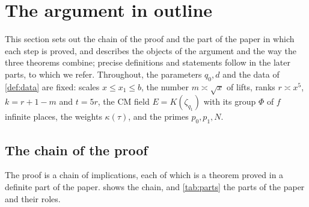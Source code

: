 \section{The argument in outline}\label{sec:overview}

This section sets out the chain of the proof and the part of the paper in which each step is proved, and
describes the objects of the argument and the way the three theorems combine; precise
definitions and statements follow in the later parts, to which we refer. Throughout, the parameters
$q_0,d$ and the data of \cref{def:data} are fixed: scales $x\le x_1\le b$, the number $m\asymp\sqrt x$
of lifts, ranks $r\asymp x^5$, $k=r+1-m$ and $t=5r$, the CM field $E=K(\zeta_{q_1})$ with its group
$\Phi$ of $f$ infinite places, the weights $\kappa(\tau)$, and the primes $p_0,p_1,N$.

\subsection{The chain of the proof}\label{ss:overview-chain}
The proof is a chain of implications, each of which is a theorem proved in a definite part of the
paper.  shows the chain, and \cref{tab:parts} the parts of the paper and their roles.

